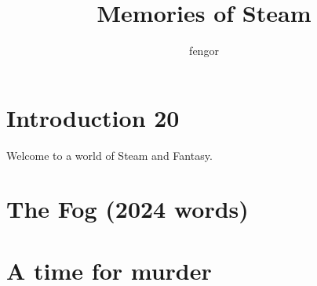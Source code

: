 \documentclass[a4paper,smart,nonsubmission]{sffms}
\title{Memories of Steam}
\author{fengor}
\begin{document}
\chapter{Introduction 20}
Welcome to a world of Steam and Fantasy. 


\chapter{The Fog (2024 words)}


\chapter{A time for murder}


\end{document}
